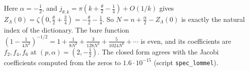 Here $\alpha=-\frac12$, and $j_{\theta,k}=\pi(k+\frac\theta2-\frac14)+O(1/k)$ gives $Z_\Lambda(0)=\zeta(0,\frac\theta2+\frac34)=-\frac\theta2-\frac14$.
So $N=n+\frac\alpha2-Z_\Lambda(0)$ is exactly the natural index of the dictionary.
The bare function $(1-\frac1{4N^2})^{-1/2}=1+\frac1{8N^2}+\frac3{128N^4}+\frac5{1024N^6}+\dotsb$ is even, and its coefficients are
$f_2,f_4,f_6$ at $(p,\alpha)=(2,-\frac12)$. The closed form agrees with the Jacobi coefficients computed from the zeros to
$1.6\cdot10^{-15}$ (script \texttt{spec\_lommel}).
